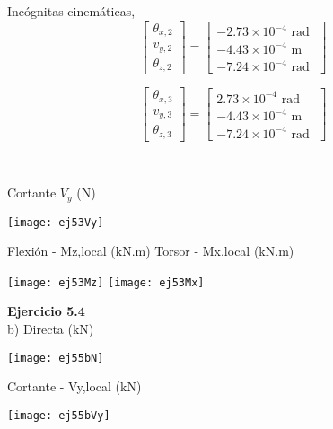 \begin{minipage}{0.45\textwidth}
	Incógnitas cinemáticas,
	$$
	\left[
	\begin{matrix}
	\theta_{x,2} \\
	v_{y,2} \\
	\theta_{z,2}
	\end{matrix}
	\right]
	=
	\left[
	\begin{matrix}
	-2.73\times 10^{-4} \text{ rad }\\
	-4.43\times 10^{-4} \text{ m }\\
	-7.24\times 10^{-4} \text{ rad }
	\end{matrix}
	\right]
	$$
	
	$$
	\left[
	\begin{matrix}
	\theta_{x,3} \\
	v_{y,3} \\
	\theta_{z,3}
	\end{matrix}
	\right]
	=
	\left[
	\begin{matrix}
	2.73\times 10^{-4} \text{ rad }\\
	-4.43\times 10^{-4} \text{ m }\\
	-7.24\times 10^{-4} \text{ rad }
	\end{matrix}
	\right]
	$$
\end{minipage}
~
\begin{minipage}{0.45\textwidth}
	Cortante $V_y$ (N)
	
	\texttt{[image: ej53Vy]}
\end{minipage}


Flexión - Mz,local (kN.m) \hfill  Torsor - Mx,local (kN.m)

\texttt{[image: ej53Mz]}
\texttt{[image: ej53Mx]}





\textbf{Ejercicio 5.4}\\


b)
Directa (kN)

	\begin{center}
	\texttt{[image: ej55bN]}
	\end{center}


Cortante - Vy,local (kN)

	\begin{center}
	\texttt{[image: ej55bVy]}
	\end{center}

